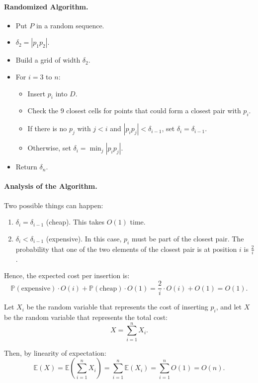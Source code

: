 \documentclass{article}
\begin{document}
\paragraph{Randomized Algorithm.}
\begin{itemize}
    \item Put $P$ in a random sequence.
    \item $\delta_2 = |p_1p_2|$.
    \item Build a grid of width $\delta_2$.
    \item For $i = 3$ to $n$:
    \begin{itemize}
        \item Insert $p_i$ into $D$.
        \item Check the 9 closest cells for points that could form a closest pair with $p_i$.
        \item If there is no $p_j$ with $j < i$ and $|p_ip_j| < \delta_{i-1}$, set $\delta_i = \delta_{i-1}$.
        \item Otherwise, set $\delta_i = \min_j |p_ip_j|$.
    \end{itemize}
    \item Return $\delta_n$.
\end{itemize}

\paragraph{Analysis of the Algorithm.}
Two possible things can happen:
\begin{enumerate}
    \item $\delta_i = \delta_{i-1}$ (cheap). This takes $O(1)$ time.
    \item $\delta_i < \delta_{i-1}$ (expensive). In this case, $p_i$ must be part of the closest pair.  
    The probability that one of the two elements of the closest pair is at position $i$ is $\frac{2}{i}$.
\end{enumerate}

Hence, the expected cost per insertion is:
\[
\mathbb{P}(\text{expensive}) \cdot O(i) + \mathbb{P}(\text{cheap}) \cdot O(1)
= \frac{2}{i} \cdot O(i) + O(1) = O(1).
\]

Let $X_i$ be the random variable that represents the cost of inserting $p_i$,  
and let $X$ be the random variable that represents the total cost:
\[
X = \sum_{i=1}^n X_i.
\]

Then, by linearity of expectation:
\[
\mathbb{E}(X) = \mathbb{E}\!\left(\sum_{i=1}^n X_i\right)
= \sum_{i=1}^n \mathbb{E}(X_i)
= \sum_{i=1}^n O(1)
= O(n).
\]
\end{document}
